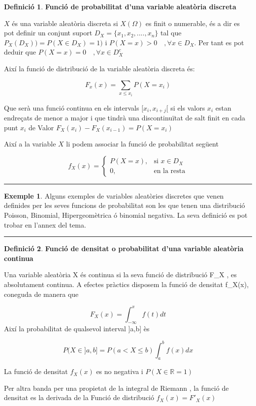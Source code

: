 \documentclass[
  catalan,
]{article}
\theoremstyle{definition}
\newtheorem{definition}{Definició}[section]
\theoremstyle{definition}
\newtheorem{example}{Exemple}[section]
\theoremstyle{definition}
\theoremstyle{definition}
\theoremstyle{remark}
\begin{document}
\begin{definition}
\textbf{Funció de probabilitat d'una variable aleatòria discreta}

\(X\) és una variable aleatòria discreta si \(X(\Omega)\) es finit o numerable, és a dir es pot definir un conjunt suport \(D_X=\{x_1,x_2,....,x_n \}\) tal que \(P_X(D_X))= P(X \in D_X)=1)\) i \(P(X=x)>0 \quad, \forall x \in D_X\). Per tant es pot deduir que \(P(X=x)=0 \quad, \forall x \in D_X^c\)

Així la funció de distribució de la variable aleatòria discreta és:

\begin{equation}
 F_x(x)=\sum_{x \leq x_i} P(X=x_i) \label{eq:Fxdiscret}
\end{equation}

Que serà una funció continua en els intervals \([x_i,x_{i+j}[\) si els valors \(x_i\) estan endreçats de menor a major i que tindrà una discontinuïtat de salt finit en cada punt \(x_i\) de Valor \(F_X(x_i)- F_X(x_{i-1})=P(X=x_i)\)

Així a la variable \(X\) li podem associar la funció de probabilitat següent

\[
f_X(x)=
\begin{cases}
P(X=x), & \text{si } x \in D_X \\
0, & \text{en la resta}
\end{cases}
\label{eq:pxdiscret}
\]
\end{definition}

\begin{center}\rule{0.5\linewidth}{0.5pt}\end{center}

\begin{example}
Alguns exemples de variables aleatòries discretes que venen definides per les seves funcions de probabilitat son les que tenen una distribució Poisson, Binomial, Hipergeomètrica ó binomial negativa. La seva definició es pot trobar en l'annex del tema.
\end{example}

\begin{center}\rule{0.5\linewidth}{0.5pt}\end{center}

\begin{definition}
\textbf{Funció de densitat o probabilitat d'una variable aleatòria continua}

Una variable aleatòria X és continua si la seva funció de distribució F\_X , es absolutament continua. A efectes pràctics disposem la funció de densitat f\_X(x), coneguda de manera que

\[
F_X(x)= \int_{-\infty}^{x}  f(t) dt  
\label{eq:Fxcont}
\]
Així la probabilitat de qualsevol interval {]}a,b{]} ès

\[
P(X \in ]a,b]= P(a<X \leq b) \int_{a}^{b}  f(x) dx \label{eq:pxcontint}
\]

La funció de densitat \(f_X(x)\) es no negativa i \(P(X \in  \mathbb{R} =1 )\)

Per altra banda per una propietat de la integral de Riemann , la funció de densitat es la derivada de la Funció de distribució \(f_X(x)=F'_X(x)\)
\end{definition}
\end{document}
